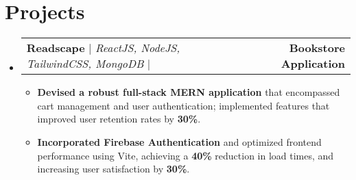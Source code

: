 \documentclass[letterpaper,11pt]{article}
\makeatletter
\newcommand{\resumeSubheading}[4]{
  \vspace{-5pt}\item
    \begin{tabular*}{1.0\textwidth}[t]{l@{\extracolsep{\fill}}r}
      \textbf{#1} & \textbf{\small #2} \\
      \textit{\small#3} & \textit{\small #4} \\
    \end{tabular*}\vspace{-5pt}
}
\newcommand{\resumeProjectHeading}[2]{
    \item
    \begin{tabular*}{1.001\textwidth}{l@{\extracolsep{\fill}}r}
      \small#1 & \textbf{\small #2}\\
    \end{tabular*}\vspace{-7pt}
}
\newcommand{\resumeSubHeadingListStart}{\begin{itemize}[leftmargin=0.0in, label={}]}
\newcommand{\resumeSubHeadingListEnd}{\end{itemize}}
\newcommand{\resumeItemListStart}{\begin{itemize}}
\newcommand{\resumeItemListEnd}{\end{itemize}\vspace{-15pt}}
\makeatother
\begin{document}

\section{Projects}
    \vspace{-4pt}
    \resumeSubHeadingListStart
        \resumeProjectHeading
          {\textbf{\large Readscape} $|$ \emph{ReactJS, NodeJS, TailwindCSS, MongoDB} $|$ \emph{\color{Blue} \href{https://readscape-sigma.vercel.app/}\faGlobe{} \href{https://github.com/sanghaibiraj/readscape}\faGithub{}}}{Bookstore Application}
          \vspace{-16pt}
          \resumeItemListStart
            \item \textbf{Devised a robust full-stack MERN application} that encompassed cart management and user authentication; implemented features that improved user retention rates by \textbf{30\%}. 
            \vspace{-4pt}
            \item \textbf{Incorporated Firebase Authentication} and optimized frontend performance using Vite, achieving a \textbf{40\%} reduction in load times, and increasing user satisfaction by \textbf{30\%}.
          \resumeItemListEnd
        \vspace{-10pt}
    \resumeSubHeadingListEnd
\end{document}
